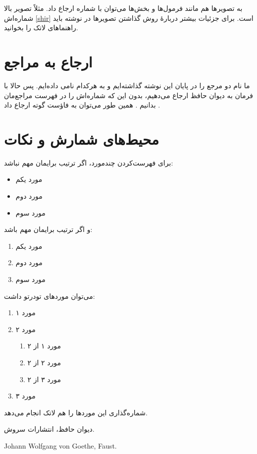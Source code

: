 \documentclass{article}
\begin{document}
به تصویرها هم مانند فرمول‌ها و بخش‌ها می‌توان با شماره ارجاع داد. مثلاً تصویر بالا شماره‌اش \ref{shir} است. برای جزئیات بیشتر دربارهٔ روش گذاشتن تصویرها در نوشته باید راهنماهای لاتک را بخوانید.
\section{ارجاع به مراجع}
ما نام دو مرجع را در پایان این نوشته گذاشته‌ایم و به هرکدام نامی داده‌ایم. پس حالا با فرمان  به دیوان حافظ ارجاع می‌دهیم، بدون این که شماره‌اش را در فهرست مراجع‌مان بدانیم \cite{حافظ}. همین طور می‌توان به فاؤست گوته ارجاع داد \cite{faust}.
\section{محیط‌های شمارش و نکات}
برای فهرست‌کردن چندمورد، اگر ترتیب برایمان مهم نباشد:
\begin{itemize}
\item مورد یکم
\item مورد دوم
\item مورد سوم
\end{itemize}
و اگر ترتیب برایمان مهم باشد:
\begin{enumerate}
\item مورد یکم
\item مورد دوم
\item مورد سوم
\end{enumerate}
می‌توان موردهای تودرتو داشت:
\begin{enumerate}
\item مورد ۱
\item مورد ۲
\begin{enumerate}
\item مورد ۱ از ۲
\item مورد ۲ از ۲
\item مورد ۳ از ۲
\end{enumerate}
\item مورد ۳
\end{enumerate}
شماره‌گذاری این موردها را هم لاتک انجام می‌دهد.


\begin{thebibliography}{9}
دیوان حافظ، انتشارات سروش.
\begin{LTRbibitems}
\resetlatinfont
{} 
Johann Wolfgang von Goethe, Faust.

\end{LTRbibitems}

\end{thebibliography}
\end{document}
